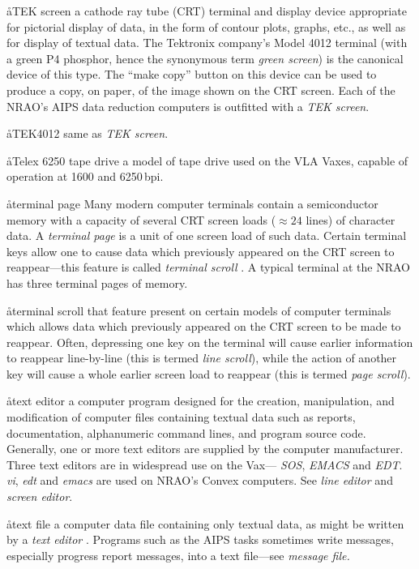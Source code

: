\aa{TEK screen}
a cathode ray tube (CRT) terminal and display device appropriate for
pictorial display of data, in the form of contour plots, graphs, etc.,
as well as for display of textual data.
The Tektronix company's Model 4012 terminal
(with a green P4 phosphor, hence the synonymous term {\it green screen}\/)
is the canonical device of this type.
The ``make copy'' button on this device can be used to produce
a copy, on paper, of the image shown on the CRT screen.
Each of the NRAO's AIPS data reduction computers is outfitted
with a {\it TEK screen}.

\aa{TEK4012} same as {\it TEK screen}.

\aa{Telex 6250 tape drive}
a model of tape drive used on the VLA Vaxes,
capable of operation at 1600 and 6250\,bpi.

\aa{terminal page}
Many modern computer terminals contain a semiconductor memory
with a capacity of several CRT screen loads ($\approx24$ lines)
of character data.
A {\it terminal page} is a unit of one screen load of such data.
Certain terminal keys allow one to cause data which previously
appeared on the CRT screen to reappear---this feature is
called {\it terminal scroll} \qv.
A typical terminal at the NRAO has three terminal pages of memory.

\aa{terminal scroll}
that feature present on certain models of computer terminals
which allows data which previously appeared on the CRT
screen to be made to reappear.
Often, depressing one key on the terminal will cause earlier
information to reappear line-by-line (this is termed {\it line
scroll}\/), while the action of another key
will cause a whole earlier screen load to reappear
(this is termed {\it page scroll}\/).

\aa{text editor}
a computer program designed for the creation, manipulation,
and modification of computer files containing textual data
such as reports, documentation, alphanumeric command lines,
and program source code.
Generally, one or more text editors are supplied by the computer
manufacturer.
Three text editors are in widespread use on the Vax---%
{\it SOS}, {\it EMACS} and {\it EDT}.  {\it vi}, {\it edt} and
{\it emacs} are used on NRAO's Convex computers.
See {\it line editor} and {\it screen editor}.

\aa{text file}
a computer data file containing only textual data, as might
be written by a {\it text editor} \qv.
Programs such as the AIPS tasks sometimes write messages, especially
progress report messages, into a text file---see {\it message file.}

